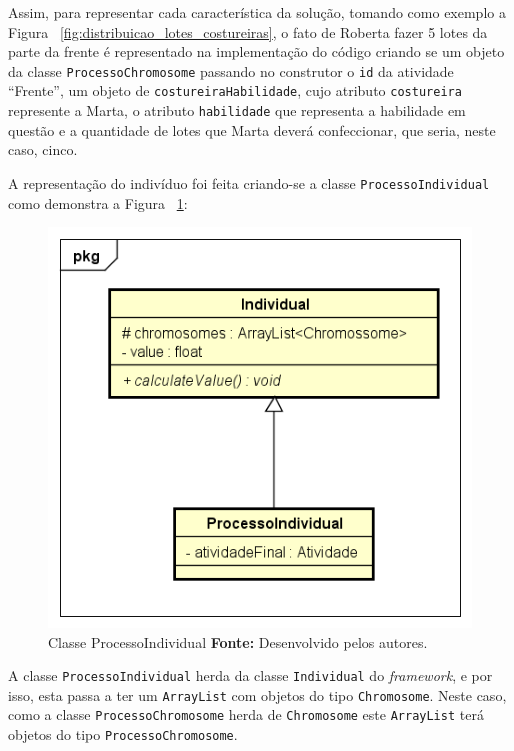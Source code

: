 \par Assim, para representar cada característica da solução, tomando como
exemplo a Figura ~\ref{fig:distribuicao_lotes_costureiras}, o fato de Roberta
fazer 5 lotes da parte da frente é representado na implementação do código criando se um objeto da classe \texttt{ProcessoChromosome} passando no
construtor o \texttt{id} da atividade ``Frente'', um objeto de
\texttt{costureiraHabilidade}, cujo atributo \texttt{costureira} represente a
Marta, o atributo \texttt{habilidade} que representa a habilidade em questão e a
quantidade de lotes que Marta deverá confeccionar, que seria, neste caso, cinco.

\par A representação do indivíduo foi feita criando-se a classe \texttt{ProcessoIndividual} 
como demonstra a Figura ~\ref{fig:class_processoIndividual}:


\begin{figure}[h!]
	\centerline{\includegraphics[scale=0.9]{./imagens/class_individual.png}}
	\caption[Classe ProcessoIndividual]
	{Classe ProcessoIndividual \textbf{Fonte:} Desenvolvido pelos autores.}
	\label{fig:class_processoIndividual}
\end{figure}

\par A classe \texttt{ProcessoIndividual} herda da classe \texttt{Individual} do
\textit{framework}, e por isso, esta passa a ter um \texttt{ArrayList} com
objetos do tipo \texttt{Chromosome}. Neste caso, como a classe \texttt{ProcessoChromosome} herda de \texttt{Chromosome} 
este \texttt{ArrayList} terá objetos do tipo \texttt{ProcessoChromosome}.

